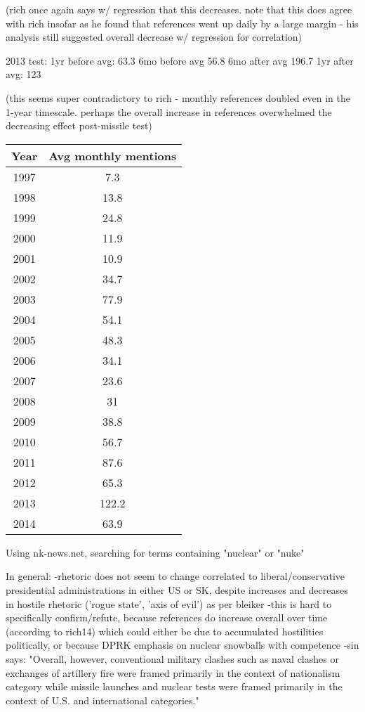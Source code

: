 \documentclass{article}
\begin{document}
(rich once again says w/ regression that this decreases. note that this does agree with rich insofar as he found that references went up daily by a large margin - his analysis still suggested overall decrease w/ regression for correlation)

2013 test:
1yr before avg: 63.3
6mo before avg 56.8
6mo after avg 196.7
1yr after avg: 123

(this seems super contradictory to rich - monthly references doubled even in the 1-year timescale. perhaps the overall increase in references overwhelmed the decreasing effect post-missile test)


\begin{tabular}{|c|c|}
	\hline
	Year & Avg monthly mentions \\
	\hline
	1997 & 7.3 \\ 
	1998 & 13.8 \\
	1999 & 24.8 \\ 
	2000 & 11.9 \\
	2001 & 10.9 \\ 
	2002 & 34.7 \\
	2003 & 77.9 \\ 
	2004 & 54.1 \\
	2005 & 48.3 \\ 
	2006 & 34.1 \\
	2007 & 23.6 \\ 
	2008 & 31 \\
	2009 & 38.8 \\ 
	2010 & 56.7 \\
	2011 & 87.6 \\ 
	2012 & 65.3 \\
	2013 & 122.2 \\ 
	2014 & 63.9 \\
	\hline
\end{tabular} 
\newline


Using nk-news.net, searching for terms containing "nuclear" or "nuke" 

In general:
-rhetoric does not seem to change correlated to liberal/conservative presidential administrations in either US or SK, despite increases and decreases in hostile rhetoric ('rogue state', 'axis of evil') as per bleiker
-this is hard to specifically confirm/refute, because references do increase overall over time (according to rich14) which could either be due to accumulated hostilities politically, or because DPRK emphasis on nuclear snowballs with competence
-sin says: "Overall, however, conventional military clashes such as naval clashes or exchanges of artillery fire were framed primarily in the context of nationalism category while missile launches and nuclear tests were framed primarily in the context of U.S. and international categories."
\end{document}
